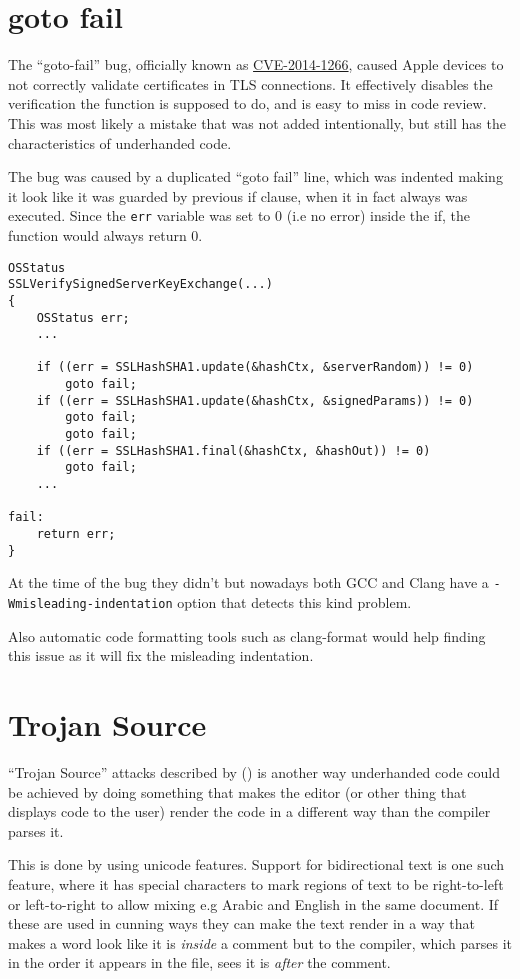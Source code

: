\documentclass[
  a4paper,
]{report}
\begin{document}
\section{goto fail}\label{goto-fail}

The ``goto-fail'' bug, officially known as
\href{https://nvd.nist.gov/vuln/detail/CVE-2014-1266}{CVE-2014-1266},
caused Apple devices to not correctly validate certificates in TLS
connections. It effectively disables the verification the function is
supposed to do, and is easy to miss in code review. This was most likely
a mistake that was not added intentionally, but still has the
characteristics of underhanded code.

The bug was caused by a duplicated ``goto fail'' line, which was
indented making it look like it was guarded by previous if clause, when
it in fact always was executed. Since the \texttt{err} variable was set
to 0 (i.e no error) inside the if, the function would always return 0.

\begin{verbatim}
OSStatus
SSLVerifySignedServerKeyExchange(...)
{
    OSStatus err;
    ...

    if ((err = SSLHashSHA1.update(&hashCtx, &serverRandom)) != 0)
        goto fail;
    if ((err = SSLHashSHA1.update(&hashCtx, &signedParams)) != 0)
        goto fail;
        goto fail;
    if ((err = SSLHashSHA1.final(&hashCtx, &hashOut)) != 0)
        goto fail;
    ...

fail:
    return err;
}
\end{verbatim}

At the time of the bug they didn't but nowadays both GCC and Clang have
a \texttt{-Wmisleading-indentation} option that detects this kind
problem.

Also automatic code formatting tools such as clang-format would help
finding this issue as it will fix the misleading indentation.

\section{Trojan Source}\label{trojan-source}

``Trojan Source'' attacks described by
() is another way
underhanded code could be achieved by doing something that makes the
editor (or other thing that displays code to the user) render the code
in a different way than the compiler parses it.

This is done by using unicode features. Support for bidirectional text
is one such feature, where it has special characters to mark regions of
text to be right-to-left or left-to-right to allow mixing e.g Arabic and
English in the same document. If these are used in cunning ways they can
make the text render in a way that makes a word look like it is
\emph{inside} a comment but to the compiler, which parses it in the
order it appears in the file, sees it is \emph{after} the comment.
\end{document}
